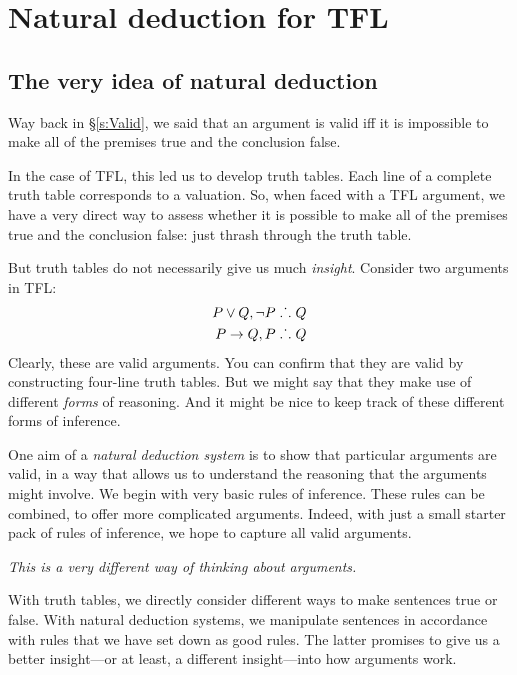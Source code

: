 \part{Natural deduction for TFL}
\label{ch.NDTFL}

\chapter{The very idea of natural deduction}\label{s:NDVeryIdea}

Way back in \S\ref{s:Valid}, we said that an argument is valid iff it is impossible to make all of the premises true and the conclusion false. 

In the case of TFL, this led us to develop truth tables. Each line of a complete truth table corresponds to a valuation. So, when faced with a TFL argument, we have a very direct way to assess whether it is possible to make all of the premises true and the conclusion false: just thrash through the truth table.

But truth tables do not necessarily give us much \emph{insight}. Consider two arguments in TFL:
	\begin{align*}
		P \vee Q, \neg P & \mathrel{\ldotp\dot{}\,\ldotp} Q\\
		P \rightarrow Q, P & \mathrel{\ldotp\dot{}\,\ldotp} Q
	\end{align*}
Clearly, these are valid arguments. You can confirm that they are valid by constructing four-line truth tables. But we might say that they make use of different \emph{forms} of reasoning. And it might be nice to keep track of these different forms of inference. 

One aim of a \emph{natural deduction system} is to show that particular arguments are valid, in a way that allows us to understand the reasoning that the arguments might involve. We begin with very basic rules of inference. These rules can be combined, to offer more complicated arguments. Indeed, with just a small starter pack of rules of inference, we hope to capture all valid arguments. 

\emph{This is a very different way of thinking about arguments.} 

With truth tables, we directly consider different ways to make sentences true or false. With natural deduction systems, we manipulate sentences in accordance with rules that we have set down as good rules. The latter promises to give us a better insight---or at least, a different insight---into how arguments work.

